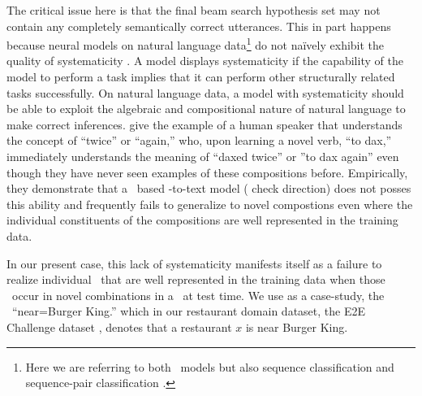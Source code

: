 The critical issue here is that the final beam search hypothesis set may
not contain any completely semantically correct utterances.
This in part happens because neural models on natural language data\footnote{Here we are referring to both \sequencetosequence~models but also 
sequence classification \citep{kim2014convolutional,mccoy2019} 
and sequence-pair classification \citep{snli}. }  do not 
na{\"i}vely exhibit the quality of systematicity \citep{fodor1988,phillips1998,marcus2003,lake18,mccoy2019,gardner2020}. A model displays systematicity if
 the capability of the model to  perform a task implies that it can perform
other structurally related tasks successfully.
On natural language data, a model with systematicity should be able to exploit the algebraic and compositional 
nature of natural language to make correct inferences. \citet{lake18} give the example of a human
speaker that understands the concept of ``twice'' or ``again,'' who, upon
learning a novel verb, ``to dax,'' immediately understands the meaning 
of ``daxed twice'' or ''to dax again'' even though they have never seen 
examples of these compositions before. Empirically, they demonstrate that a
\recurrentneuralnetwork~based \meaningrepresentation-to-text model ({\color{red} check direction}) does not posses this ability and frequently fails to 
generalize to novel compostions even where the individual constituents of 
the compositions are well represented in the training data.

In our present case, this lack of systematicity manifests itself as a failure
to realize individual \attributevalues~that are well represented in the 
training data when those \attributevalues~occur in novel combinations in a 
 \meaningrepresentation~at test time. We use as a case-study, the \attributevalue~``near=Burger King.'' which in our restaurant domain dataset, the E2E Challenge dataset \citep{dusek2018}, denotes that a restaurant $x$ is near
Burger King. 



